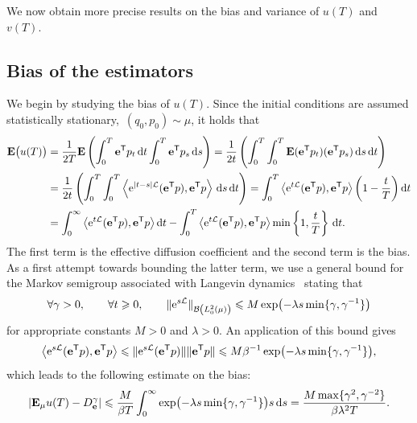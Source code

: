 \documentclass[11pt,a4paper]{article}
\newcommand{\e}{\mathrm{e}}
\newcommand{\expect}[0]{\mathbf{E}}
\newcommand{\vect}[1]{\boldsymbol{\mathbf #1}}
\renewcommand{\d}{\mathrm d}
\renewcommand{\t}{\mathsf T}
\theoremstyle{plain}
\numberwithin{equation}{section}
\renewcommand{\leq}{\leqslant}
\renewcommand{\geq}{\geqslant}
\begin{document}
We now obtain more precise results on the bias and variance of $u(T)$ and $v(T)$.

\subsection{Bias of the estimators}%
We begin by studying the bias of $u(T)$.
Since the initial conditions are assumed statistically stationary,~$(q_0, p_0) \sim \mu$,
it holds that
\begin{equation}
\label{eq:bias_without_control}
\begin{aligned}
    \expect \bigl(u(T)\bigr)
    &= \frac{1}{2T} \expect \left( \int_{0}^{T} \vect e^\t p_{t} \, \d t \int_{0}^{T} \vect e^\t p_s \, \d s \right)
    = \frac{1}{2t} \left( \int_{0}^{T} \int_{0}^{T} \expect (\vect e^\t p_t) (\vect e^\t p_s) \, \d s \, \d t \right) \\
    &= \frac{1}{2t} \left( \int_{0}^{T} \int_{0}^{T} \ip{\e^{\abs{t - s} \mathcal L}(\vect e^\t p)}{\vect e^\t p} \, \d s \, \d t \right)
    =  \int_{0}^{T} \ip{\e^{t \mathcal L} (\vect e^\t p)}{\vect e^\t p} \left(1 - \frac{t}{T}\right) \d t  \\
    &= \int_{0}^{\infty} \ip{\e^{t \mathcal L}(\vect e^\t p)}{\vect e^\t p}  \d t - \int_{0}^{T} \ip{\e^{t \mathcal L} (\vect e^\t p)}{\vect e^\t p} \min\left\{1, \frac{t}{T}\right\} \, \d t.
\end{aligned}
\end{equation}
The first term is the effective diffusion coefficient
and the second term is the bias.
As a first attempt towards bounding the latter term,
we use a general bound for the Markov semigroup associated with Langevin dynamics~\cite{roussel2018spectral}
stating that
\begin{equation}
    \label{eq:decay_semigroup_general}
    \forall \gamma > 0, \qquad \forall t \geq 0, \qquad
    \norm*{ \e^{s \mathcal L} }[\mathcal B \left(L^2_0\left(\mu\right) \right)] \leq M \exp \bigl(- \lambda s \min\{\gamma, \gamma^{-1}\} \bigr)
\end{equation}
for appropriate constants $M > 0$ and $\lambda > 0$.
An application of this bound gives
\[
    \ip{\e^{s \mathcal L}(\vect e^\t p)}{\vect e^\t p}
    \leq \norm*{\e^{s \mathcal L}(\vect e^\t p)} \norm*{\vect e^\t p}
    \leq M \beta^{-1} \exp\bigl(- \lambda s \min\{\gamma, \gamma^{-1}\}\bigr),
\]
which leads to the following estimate on the bias:
\begin{equation}
    \label{eq:bias}
    \abs{\expect_{\mu} u(T) - D_{\vect e}^{\gamma}}
    \leq \frac{M}{\beta T}\int_{0}^{\infty} \exp\bigl(- \lambda s \min\{\gamma, \gamma^{-1}\}\bigr) s \, \d s
    = \frac{M \max \{\gamma^2, \gamma^{-2}\}}{\beta \lambda^2 T}.
\end{equation}
\end{document}
